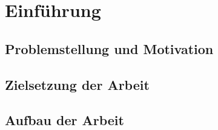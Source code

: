 \chapter{Einführung}\label{ch:intro}

\section{Problemstellung und Motivation}\label{sec:intro_problem}

\section{Zielsetzung der Arbeit}\label{sec:intro_objective}

\section{Aufbau der Arbeit}\label{sec:intro_structure}